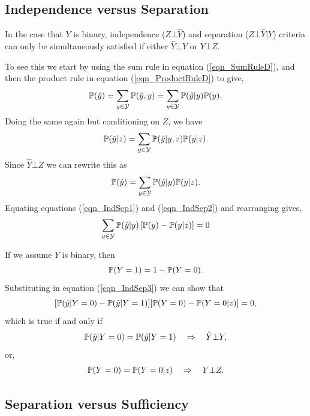 \subsection{Independence versus Separation}

\begin{lookbox}
In the case that $Y$ is binary, independence ($Z \bot \hat{Y}$) and separation ($Z \bot \hat{Y} | Y$) criteria can only be simultaneously satisfied if either $\hat{Y} \bot Y$ or $Y \bot Z$.
\end{lookbox}

To see this we start by using the sum rule in equation (\ref{eqn_SumRuleD}), and then the product rule in equation (\ref{eqn_ProductRuleD}) to give,
\begin{equation} \label{eqn_IndSep1}
\mathbb{P}(\hat{y}) = \sum_{y\in\mathcal{Y}} \mathbb{P}(\hat{y}, y)
               = \sum_{y\in\mathcal{Y}} \mathbb{P}(\hat{y}|y) \mathbb{P}(y).
\end{equation}
Doing the same again but conditioning on $Z$, we have
\[
\mathbb{P}(\hat{y}|z) = \sum_{y\in\mathcal{Y}} \mathbb{P}(\hat{y}|y, z) \mathbb{P}(y|z). \]
Since $\hat{Y} \bot Z$ we can rewrite this as
\begin{equation} \label{eqn_IndSep2}
\mathbb{P}(\hat{y}) = \sum_{y\in\mathcal{Y}} \mathbb{P}(\hat{y}|y) \mathbb{P}(y|z).
\end{equation}
Equating equations (\ref{eqn_IndSep1}) and (\ref{eqn_IndSep2}) and rearranging gives,
\begin{equation} \label{eqn_IndSep3}
\sum_{y\in\mathcal{Y}} \mathbb{P}(\hat{y}|y) \left[\mathbb{P}(y)-\mathbb{P}(y|z)\right] = 0
\end{equation}

If we assume $Y$ is binary, then
\[
\mathbb{P}(Y=1)=1-\mathbb{P}(Y=0).
\]
Substituting in equation (\ref{eqn_IndSep3}) we can show that
\[
[\mathbb{P}(\hat{y}|Y=0)-\mathbb{P}(\hat{y}|Y=1)][\mathbb{P}(Y=0)-\mathbb{P}(Y=0|z)] = 0,
\]
which is true if and only if
\[
\mathbb{P}(\hat{y}|Y=0) = \mathbb{P}(\hat{y}|Y=1) \quad \Rightarrow \quad
\hat{Y} \bot Y,
\]
or,
\[
\mathbb{P}(Y=0) = \mathbb{P}(Y=0|z)  \quad \Rightarrow \quad Y \bot Z.
\]

\subsection{Separation versus Sufficiency}

